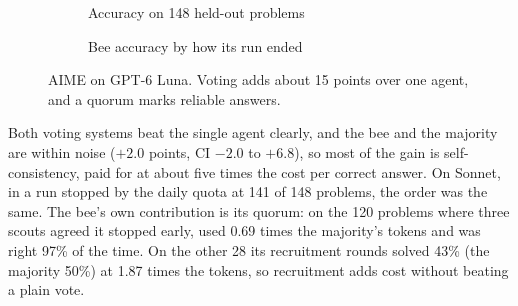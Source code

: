 \documentclass[12pt,a4paper]{article}
\begin{document}
\begin{figure}[H]
\centering
\begin{subfigure}[b]{0.48\linewidth}
\centering
{}
\caption{Accuracy on 148 held-out problems}
\end{subfigure}\hfill
\begin{subfigure}[b]{0.48\linewidth}
\centering
{}
\caption{Bee accuracy by how its run ended}
\end{subfigure}
\caption{AIME on GPT-6 Luna. Voting adds about 15 points over one agent, and a quorum marks reliable
answers.}
\label{fig:aime}
\end{figure}

Both voting systems beat the single agent clearly, and the bee and the majority are within noise
($+2.0$ points, CI $-2.0$ to $+6.8$), so most of the gain is self-consistency, paid for at about five
times the cost per correct answer. On Sonnet, in a run stopped by the daily quota at 141 of 148 problems,
the order was the same. The bee's own contribution is its quorum: on the 120 problems where three scouts
agreed it stopped early, used 0.69 times the majority's tokens and was right 97\% of the time. On the
other 28 its recruitment rounds solved 43\% (the majority 50\%) at 1.87 times the tokens, so recruitment
adds cost without beating a plain vote.
\end{document}
